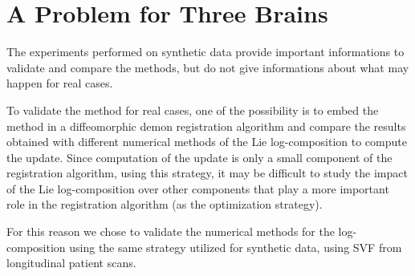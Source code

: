 
\section{A Problem for Three Brains}\label{se:three_brains} %
The experiments performed on synthetic data provide important informations to validate and compare the methods, but do not give informations about what may happen for real cases. 

To validate the method for real cases, one of the possibility is to embed the method in a diffeomorphic demon registration algorithm and compare the results obtained with different numerical methods of the Lie log-composition to compute the update. Since computation of the update is only a small component of the registration algorithm, using this strategy, it may be difficult to study the impact of the Lie log-composition over other components that play a more important role in the registration algorithm (as the optimization strategy).

For this reason we chose to validate the numerical methods for the log-composition using the same strategy utilized for synthetic data, using SVF from longitudinal patient scans.

